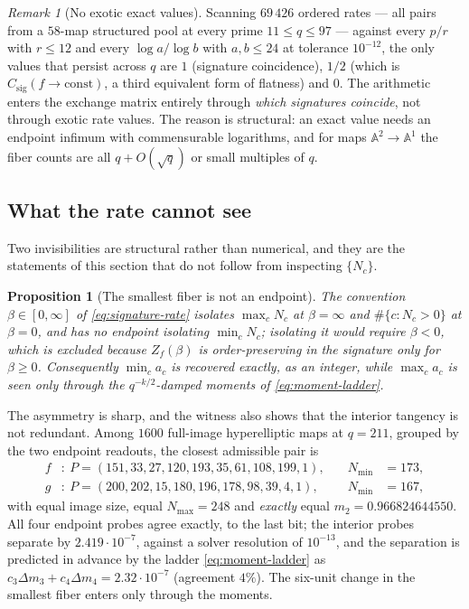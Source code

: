 \documentclass[11pt]{article}
\theoremstyle{definition}
\theoremstyle{plain}
\newtheorem{proposition}[definition]{Proposition}
\theoremstyle{remark}
\newtheorem{remark}[definition]{Remark}
\newcommand{\csig}{C_{\mathrm{sig}}}
\begin{document}
\begin{remark}[No exotic exact values]
Scanning \(69\,426\) ordered rates --- all pairs from a \(58\)-map structured
pool at every prime \(11\le q\le97\) --- against every \(p/r\) with \(r\le12\)
and every \(\log a/\log b\) with \(a,b\le24\) at tolerance \(10^{-12}\), the
only values that persist across \(q\) are \(1\) (signature coincidence),
\(1/2\) (which is \(\csig(f\to\text{const})\), a third equivalent form of
flatness) and \(0\).  The arithmetic enters the exchange matrix entirely through
\emph{which signatures coincide}, not through exotic rate values.  The reason is
structural: an exact value needs an endpoint infimum with commensurable
logarithms, and for maps \(\mathbb A^2\to\mathbb A^1\) the fiber counts are all
\(q+O(\sqrt q)\) or small multiples of \(q\).
\end{remark}

\subsection{What the rate cannot see}
\label{sub:invisible}

Two invisibilities are structural rather than numerical, and they are the
statements of this section that do not follow from inspecting \(\{N_c\}\).

\begin{proposition}[The smallest fiber is not an endpoint]
\label{prop:smallest-fiber}
The convention \(\beta\in[0,\infty]\) of \eqref{eq:signature-rate} isolates
\(\max_cN_c\) at \(\beta=\infty\) and \(\#\{c:N_c>0\}\) at \(\beta=0\), and has
no endpoint isolating \(\min_cN_c\); isolating it would require \(\beta<0\),
which is excluded because \(Z_f(\beta)\) is order-preserving in the signature
only for \(\beta\ge0\).  Consequently \(\min_ca_c\) is recovered exactly, as an integer,
while \(\max_ca_c\) is seen only through the \(q^{-k/2}\)-damped moments of
\eqref{eq:moment-ladder}.
\end{proposition}

The asymmetry is sharp, and the witness also shows that the interior tangency is
not redundant.  Among \(1600\) full-image hyperelliptic maps at \(q=211\),
grouped by the two endpoint readouts, the closest admissible pair is
\[
\begin{aligned}
  f&:\ P=(151,33,27,120,193,35,61,108,199,1), &\quad N_{\min}&=173,\\
  g&:\ P=(200,202,15,180,196,178,98,39,4,1), &\quad N_{\min}&=167,
\end{aligned}
\]
with equal image size, equal \(N_{\max}=248\) and \emph{exactly} equal
\(m_2=0.966824644550\).  All four endpoint probes agree exactly, to the last
bit; the interior probes separate by \(2.419\cdot10^{-7}\), against a solver
resolution of \(10^{-13}\), and the separation is predicted in advance by the
ladder \eqref{eq:moment-ladder} as \(c_3\Delta m_3+c_4\Delta m_4=2.32\cdot10^{-7}\)
(agreement \(4\%\)).  The six-unit change in the smallest fiber enters only
through the moments.
\end{document}

